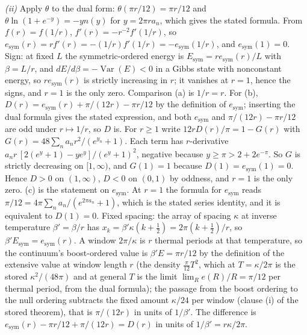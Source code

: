 \emph{(ii)} Apply $\theta$ to the dual form: $\theta(\pi r/12) = \pi r/12$ and $\theta\ln(1 + e^{-y}) = -yn(y)$ for $y = 2\pi ra_{n}$, which gives the stated formula. From $f(r) = f(1/r)$, $f'(r) = -r^{-2}f'(1/r)$, so $e_{\mathrm{sym}}(r) = rf'(r) = -(1/r)f'(1/r) = -e_{\mathrm{sym}}(1/r)$, and $e_{\mathrm{sym}}(1) = 0$. Sign: at fixed $L$ the symmetric-ordered energy is $E_{\mathrm{sym}} = re_{\mathrm{sym}}(r)/L$ with $\beta = L/r$, and $dE/d\beta = -\operatorname{Var}(E) < 0$ in a Gibbs state with nonconstant energy, so $re_{\mathrm{sym}}(r)$ is strictly increasing in $r$; it vanishes at $r = 1$, hence the signs, and $r = 1$ is the only zero. Comparison (a) is $1/r = r$. For (b), $D(r) = e_{\mathrm{sym}}(r) + \pi/(12r) - \pi r/12$ by the definition of $e_{\mathrm{sym}}$; inserting the dual formula gives the stated expression, and both $e_{\mathrm{sym}}$ and $\pi/(12r) - \pi r/12$ are odd under $r \mapsto 1/r$, so $D$ is. For $r \ge 1$ write $12rD(r)/\pi = 1 - G(r)$ with $G(r) = 48\sum_{n}a_{n}r^{2}/(e^{y_{n}} + 1)$. Each term has $r$-derivative $a_{n}r\,[2(e^{y} + 1) - ye^{y}]/(e^{y} + 1)^{2}$, negative because $y \ge \pi > 2 + 2e^{-\pi}$. So $G$ is strictly decreasing on $[1, \infty)$, and $G(1) = 1$ because $D(1) = e_{\mathrm{sym}}(1) = 0$. Hence $D > 0$ on $(1, \infty)$, $D < 0$ on $(0, 1)$ by oddness, and $r = 1$ is the only zero. (c) is the statement on $e_{\mathrm{sym}}$. At $r = 1$ the formula for $e_{\mathrm{sym}}$ reads $\pi/12 = 4\pi\sum_{n}a_{n}/(e^{2\pi a_{n}} + 1)$, which is the stated series identity, and it is equivalent to $D(1) = 0$. Fixed spacing: the array of spacing $\kappa$ at inverse temperature $\beta' = \beta/r$ has $x_{k} = \beta'\kappa(k + \tfrac12) = 2\pi(k + \tfrac12)/r$, so $\beta'E_{\mathrm{sym}} = e_{\mathrm{sym}}(r)$. A window $2\pi/\kappa$ is $r$ thermal periods at that temperature, so the continuum's boost-ordered value is $\beta'E = \pi r/12$ by the definition of the extensive value at window length $r$ (the density $\tfrac{\pi}{12}T^{2}$, which at $T = \kappa/2\pi$ is the stored $\kappa^{2}/(48\pi)$ and at general $T$ is the limit $\lim_{R}e(R)/R = \pi/12$ per thermal period, from the dual formula); the passage from the boost ordering to the null ordering subtracts the fixed amount $\kappa/24$ per window (clause (i) of the stored theorem), that is $\pi/(12r)$ in units of $1/\beta'$. The difference is $e_{\mathrm{sym}}(r) - \pi r/12 + \pi/(12r) = D(r)$ in units of $1/\beta' = r\kappa/2\pi$.

